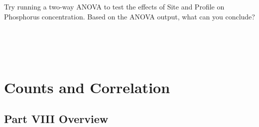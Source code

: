 \documentclass[
]{scrbook}
\begin{document}
\begin{verbatim}





\end{verbatim}

Try running a two-way ANOVA to test the effects of Site and Profile on Phosphorus concentration.
Based on the ANOVA output, what can you conclude?

\begin{verbatim}




\end{verbatim}

\hypertarget{part-counts-and-correlation}{%
\part{Counts and Correlation}\label{part-counts-and-correlation}}

\hypertarget{Week9}{%
\chapter*{Part VIII Overview}\label{Week9}}
\end{document}

